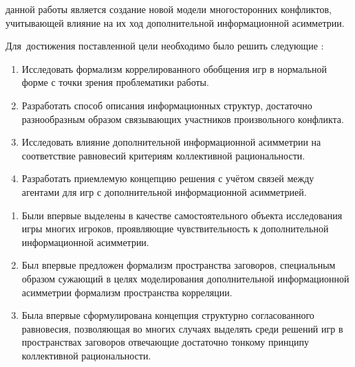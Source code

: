 {\aim} данной работы является создание новой модели многосторонних конфликтов, учитывающей влияние на их ход дополнительной информационной асимметрии.

Для~достижения поставленной цели необходимо было решить следующие {\tasks}:
\begin{enumerate}[beginpenalty=10000] %
	\item Исследовать формализм коррелированного обобщения игр в нормальной форме с точки зрения проблематики работы.
	\item Разработать способ описания информационных структур, достаточно разнообразным образом связывающих участников произвольного конфликта.
	\item Исследовать влияние дополнительной информационной асимметрии на соответствие равновесий критериям коллективной рациональности.
	\item Разработать приемлемую концепцию решения с учётом связей между агентами для игр с дополнительной информационной асимметрией.
\end{enumerate}


{\novelty}
\begin{enumerate}[beginpenalty=10000] %
	\item Были впервые выделены в качестве самостоятельного объекта исследования игры многих игроков, проявляющие чувствительность к дополнительной информационной асимметрии.
	\item Был впервые предложен формализм пространства заговоров, специальным образом сужающий в целях моделирования дополнительной информационной асимметрии формализм пространства корреляции.
	\item Была впервые сформулирована концепция структурно согласованного равновесия, позволяющая во многих случаях выделять среди решений игр в пространствах заговоров отвечающие достаточно тонкому принципу коллективной рациональности.  
\end{enumerate}


